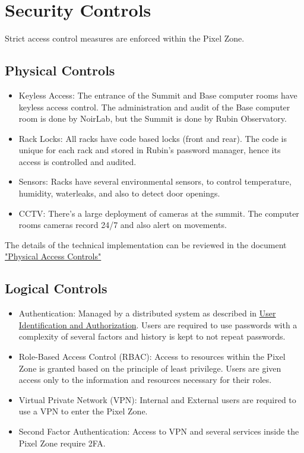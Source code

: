 \section{Security Controls}
Strict access control measures are enforced within the Pixel Zone.
\subsection{Physical Controls}
\begin{itemize}
    \item Keyless Access: The entrance of the Summit and Base computer rooms have keyless access control. The administration and audit of the Base computer room is done by NoirLab, but the Summit is done by Rubin Observatory.
    \item Rack Locks: All racks have code based locks (front and rear). The code is unique for each rack and stored in Rubin's password manager, hence its access is controlled and audited.
    \item Sensors: Racks have several environmental sensors, to control temperature, humidity, waterleaks, and also to detect door openings.
    \item CCTV: There's a large deployment of cameras at the summit. The computer rooms cameras record 24/7 and also alert on movements. 
\end{itemize}

The details of the technical implementation can be reviewed in the document \href{http://ittn-077.lsst.io}{"Physical Access Controls"}

\subsection{Logical Controls}
\begin{itemize}
    \item Authentication: Managed by a distributed system as described in \href{http://ittn-010.lsst.io}{User Identification and Authorization}. Users are required to use passwords with a complexity of several factors and history is kept to not repeat passwords. 
    \item Role-Based Access Control (RBAC): Access to resources within the Pixel Zone is granted based on the principle of least privilege. Users are given access only to the information and resources necessary for their roles.
    \item Virtual Private Network (VPN): Internal and External users are required to use a VPN to enter the Pixel Zone. 
    \item Second Factor Authentication: Access to VPN and several services inside the Pixel Zone require 2FA. 
\end{itemize}

